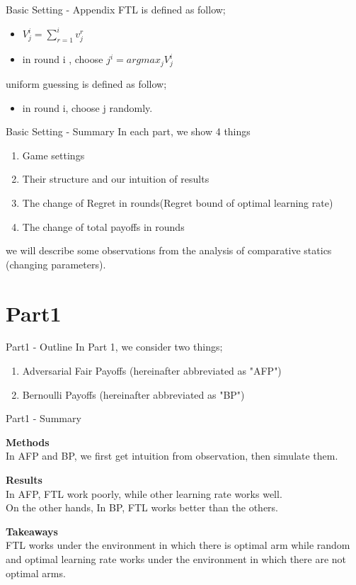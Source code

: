 \documentclass{beamer}
\begin{document}
\begin{frame}{Basic Setting - Appendix}
    FTL is defined as follow;
    \begin{itemize}
        \item $V_j^i = \sum_{r=1}^i v_j^r$
        \item in round i , choose $j^i = argmax_j V_j^i$
    \end{itemize}
    uniform guessing is defined as follow;
    \begin{itemize}
      \item in round i, choose j randomly.
    \end{itemize}
\end{frame}

\begin{frame}{Basic Setting - Summary}
    In each part, we show 4 things
    \begin{enumerate}
        \item Game settings
        \item Their structure and our intuition of results
        \item The change of Regret in rounds(Regret bound of optimal learning rate)
        \item The change of total payoffs in rounds
    \end{enumerate}
    we will describe some observations from the analysis of comparative statics (changing parameters). 
\end{frame}

\section{Part1}
\begin{frame}{Part1 - Outline}
In Part 1, we consider two things;
\begin{enumerate}
    \item Adversarial Fair Payoffs (hereinafter abbreviated as "AFP") 
    \item Bernoulli Payoffs (hereinafter abbreviated as "BP")
\end{enumerate}
\end{frame}

\begin{frame}{Part1 - Summary}

\textbf{Methods}\\
In AFP and BP, we first get intuition from observation, then simulate them.
\vspace{1em}

\textbf{Results}\\
In AFP, FTL work poorly, while other learning rate works well.\\
On the other hands, In BP, FTL works better than the others. 
\vspace{1em}

\textbf{Takeaways}\\
FTL works under the environment in which there is optimal arm while random and optimal learning rate works under the environment in which there are not optimal arms.

\end{frame}
\end{document}
